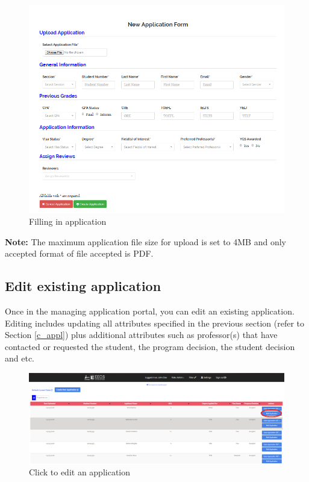 \documentclass[fontsize=12pt,paper=letter,twoside]{scrartcl}
\begin{document}
\clearpage
\begin{figure}[!htb]
\begin{center}
\includegraphics[width=.99\textwidth]{images/ma/fill_in_app.png}
\end{center}
\caption{Filling in application}
\label{fig:fill_in_app}
\end{figure}

\smallskip
\noindent \textbf{Note:} The maximum application file size for upload is set to 4MB and only accepted format of file accepted is PDF.

\clearpage
\subsection{Edit existing application}
Once in the managing application portal, you can edit an existing application. Editing includes updating all attributes specified in the previous section (refer to Section \ref{c_appl}) plus additional attributes such as professor(s) that have contacted or requested the student, the program decision, the student decision and etc.

\begin{figure}[!htb]
\begin{center}
\includegraphics[width=.99\textwidth]{images/ma/edit_appl.png}
\end{center}
\caption{Click to edit an application}
\label{fig:edit_appl}
\end{figure}
\end{document}

